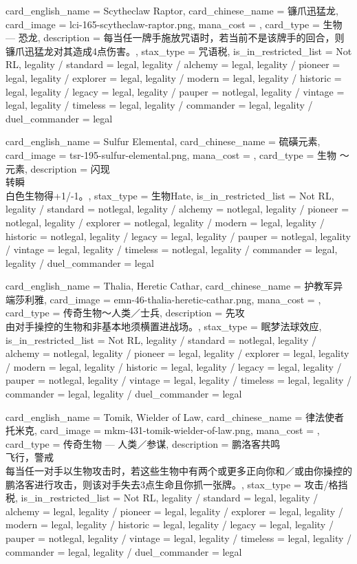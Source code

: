 \documentclass[lang = cn, color = black, 10pt]{AllThatStax}
\begin{document}
\card
{
	card_english_name = {Scytheclaw Raptor},
	card_chinese_name = {镰爪迅猛龙},
	card_image = lci-165-scytheclaw-raptor.png,
	mana_cost = ,
	card_type = 生物 — 恐龙,
	description = {每当任一牌手施放咒语时，若当前不是该牌手的回合，则镰爪迅猛龙对其造成4点伤害。},
	stax_type = 咒语税,
	is_in_restricted_list = Not RL,
	legality / standard = legal,
	legality / alchemy = legal,
	legality / pioneer = legal,
	legality / explorer = legal,
	legality / modern = legal,
	legality / historic = legal,
	legality / legacy = legal,
	legality / pauper = notlegal,
	legality / vintage = legal,
	legality / timeless = legal,
	legality / commander = legal,
	legality / duel_commander = legal
}

\card
{
	card_english_name = {Sulfur Elemental},
	card_chinese_name = {硫磺元素},
	card_image = tsr-195-sulfur-elemental.png,
	mana_cost = ,
	card_type = 生物 ～元素,
	description = {闪现\\
		转瞬\\
		白色生物得+1/-1。},
	stax_type = 生物Hate,
	is_in_restricted_list = Not RL,
	legality / standard = notlegal,
	legality / alchemy = notlegal,
	legality / pioneer = notlegal,
	legality / explorer = notlegal,
	legality / modern = legal,
	legality / historic = notlegal,
	legality / legacy = legal,
	legality / pauper = notlegal,
	legality / vintage = legal,
	legality / timeless = notlegal,
	legality / commander = legal,
	legality / duel_commander = legal
}

\card
{
	card_english_name = {Thalia, Heretic Cathar},
	card_chinese_name = {护教军异端莎利雅},
	card_image = emn-46-thalia-heretic-cathar.png,
	mana_cost = ,
	card_type = 传奇生物～人类／士兵,
	description = {先攻\\
		由对手操控的生物和非基本地须横置进战场。},
	stax_type = 眠梦法球效应,
	is_in_restricted_list = Not RL,
	legality / standard = notlegal,
	legality / alchemy = notlegal,
	legality / pioneer = legal,
	legality / explorer = legal,
	legality / modern = legal,
	legality / historic = legal,
	legality / legacy = legal,
	legality / pauper = notlegal,
	legality / vintage = legal,
	legality / timeless = legal,
	legality / commander = legal,
	legality / duel_commander = legal
}

\card
{
	card_english_name = {Tomik, Wielder of Law},
	card_chinese_name = {律法使者托米克},
	card_image = mkm-431-tomik-wielder-of-law.png,
	mana_cost = ,
	card_type = 传奇生物 — 人类／参谋,
	description = {鹏洛客共鸣\\
		飞行，警戒\\
		每当任一对手以生物攻击时，若这些生物中有两个或更多正向你和／或由你操控的鹏洛客进行攻击，则该对手失去3点生命且你抓一张牌。},
	stax_type = 攻击/格挡税,
	is_in_restricted_list = Not RL,
	legality / standard = legal,
	legality / alchemy = legal,
	legality / pioneer = legal,
	legality / explorer = legal,
	legality / modern = legal,
	legality / historic = legal,
	legality / legacy = legal,
	legality / pauper = notlegal,
	legality / vintage = legal,
	legality / timeless = legal,
	legality / commander = legal,
	legality / duel_commander = legal
}
\end{document}
